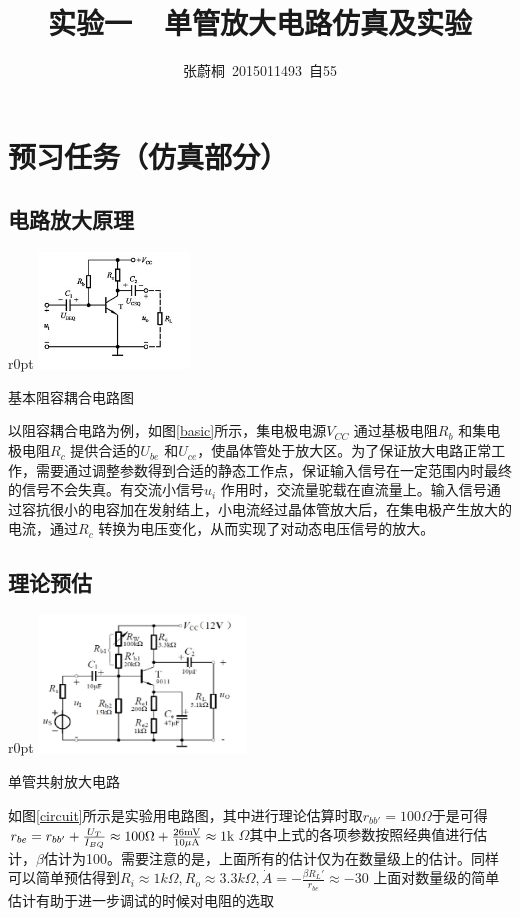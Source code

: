 \documentclass[UTF8,a4paper]{ctexart}
\title{实验一\ \ 单管放大电路仿真及实验}
\author{张蔚桐\ 2015011493\ 自55}
\begin{document}
\maketitle
\section{预习任务（仿真部分）}
\subsection{电路放大原理}
\begin {wrapfigure}{r}{0pt}
\includegraphics [width=40mm]{basic.jpg}
\caption{基本阻容耦合电路图}
\label{basic}
\end {wrapfigure}
以阻容耦合电路为例，如图\ref{basic}所示，集电极电源$V_{CC}$ 通过基极电阻$R_b$ 和集电极电阻$R_c$ 提供合适的$U_{be}$ 和$U_{ce}$，使晶体管处于放大区。为了保证放大电路正常工作，需要通过调整参数得到合适的静态工作点，保证输入信号在一定范围内时最终的信号不会失真。有交流小信号$u_i$ 作用时，交流量驼载在直流量上。输入信号通过容抗很小的电容加在发射结上，小电流经过晶体管放大后，在集电极产生放大的电流，通过$R_c$ 转换为电压变化，从而实现了对动态电压信号的放大。
\subsection{理论预估}
\begin {wrapfigure}{r}{0pt}
\includegraphics [width=55mm]{circuit.jpg}
\caption{单管共射放大电路}
\label{circuit}
\end {wrapfigure}
如图\ref{circuit}所示是实验用电路图，其中进行理论估算时取$r_{bb'}=100\Omega$于是可得$r_{be}=r_{bb'}+\frac{U_T}{I_{BQ}}\approx100\Omega+\frac{26\rm{mV}}{10\rm{\mu A}}\approx1\rm{k}$$\Omega$其中上式的各项参数按照经典值进行估计，$\beta$估计为100。需要注意的是，上面所有的估计仅为在数量级上的估计。同样可以简单预估得到$R_i\approx1k\Omega,R_o\approx3.3k\Omega,\dot{A}=-\frac{\beta R_L'}{r_{be}}\approx-30$ 上面对数量级的简单估计有助于进一步调试的时候对电阻的选取
\end{document}
